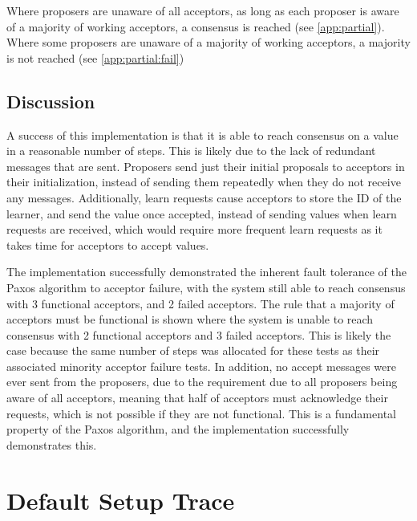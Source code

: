 \documentclass[a4paper, 12pt]{article}
\begin{document}
Where proposers are unaware of all acceptors, as long as each proposer is aware of a majority of working acceptors, a consensus is reached (see \autoref{app:partial}). Where some proposers are unaware of a majority of working acceptors, a majority is not reached (see \autoref{app:partial:fail})



\subsection{Discussion}

A success of this implementation is that it is able to reach consensus on a value in a reasonable number of steps. This is likely due to the lack of redundant messages that are sent. Proposers send just their initial proposals to acceptors in their initialization, instead of sending them repeatedly when they do not receive any messages. Additionally, learn requests cause acceptors to store the ID of the learner, and send the value once accepted, instead of sending values when learn requests are received, which would require more frequent learn requests as it takes time for acceptors to accept values.

The implementation successfully demonstrated the inherent fault tolerance of the Paxos algorithm to acceptor failure, with the system still able to reach consensus with 3 functional acceptors, and 2 failed acceptors. The rule that a majority of acceptors must be functional is shown where the system is unable to reach consensus with 2 functional acceptors and 3 failed acceptors. This is likely the case because the same number of steps was allocated for these tests as their associated minority acceptor failure tests. In addition, no accept messages were ever sent from the proposers, due to the requirement due to all proposers being aware of all acceptors, meaning that half of acceptors must acknowledge their requests, which is not possible if they are not functional. This is a fundamental property of the Paxos algorithm, and the implementation successfully demonstrates this.


\pagebreak


\appendix
\section{Default Setup Trace}\label{app:default}
\end{document}
